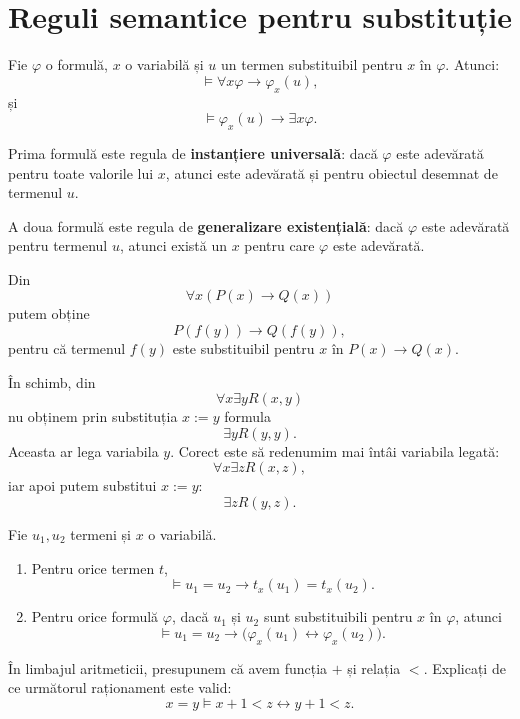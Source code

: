 \section{Reguli semantice pentru substituție}

\begin{prop}
	Fie \( \varphi \) o formulă, \(x\) o variabilă și \(u\) un termen substituibil pentru \(x\) în \( \varphi \). Atunci:
	\[
		\models \forall x\varphi \to \varphi_x(u),
	\]
	și
	\[
		\models \varphi_x(u) \to \exists x\varphi.
	\]
\end{prop}

\begin{note}
	Prima formulă este regula de \textbf{instanțiere universală}: dacă \( \varphi \) este adevărată pentru toate valorile lui \(x\), atunci este adevărată și pentru obiectul desemnat de termenul \(u\).

	A doua formulă este regula de \textbf{generalizare existențială}: dacă \( \varphi \) este adevărată pentru termenul \(u\), atunci există un \(x\) pentru care \( \varphi \) este adevărată.
\end{note}

\begin{eg}
	Din
	\[
		\forall x(P(x) \to Q(x))
	\]
	putem obține
	\[
		P(f(y)) \to Q(f(y)),
	\]
	pentru că termenul \(f(y)\) este substituibil pentru \(x\) în \(P(x)\to Q(x)\).

	În schimb, din
	\[
		\forall x \exists y R(x,y)
	\]
	nu obținem prin substituția \(x:=y\) formula
	\[
		\exists y R(y,y).
	\]
	Aceasta ar lega variabila \(y\). Corect este să redenumim mai întâi variabila legată:
	\[
		\forall x \exists z R(x,z),
	\]
	iar apoi putem substitui \(x:=y\):
	\[
		\exists z R(y,z).
	\]
\end{eg}

\begin{prop}
	Fie \(u_1,u_2\) termeni și \(x\) o variabilă.
	\begin{enumerate}
		\item Pentru orice termen \(t\),
		      \[
			      \models u_1=u_2 \to t_x(u_1)=t_x(u_2).
		      \]
		\item Pentru orice formulă \( \varphi \), dacă \(u_1\) și \(u_2\) sunt substituibili pentru \(x\) în \( \varphi \), atunci
		      \[
			      \models u_1=u_2 \to \big(\varphi_x(u_1) \leftrightarrow \varphi_x(u_2)\big).
		      \]
	\end{enumerate}
\end{prop}


\begin{ex}
	În limbajul aritmeticii, presupunem că avem funcția \(+\) și relația \(<\). Explicați de ce următorul raționament este valid:
	\[
		x = y \models x+1 < z \leftrightarrow y+1 < z.
	\]
\end{ex}

